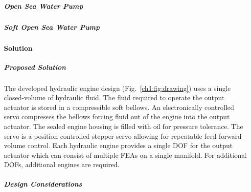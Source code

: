 \hypertarget{ch1:open-sea-water-pump}{%
\subparagraph{Open Sea Water Pump}\label{ch1:open-sea-water-pump}}



\hypertarget{ch1:soft-open-sea-water-pump}{%
\subparagraph{Soft Open Sea Water Pump}\label{ch1:soft-open-sea-water-pump}}

\hypertarget{ch1:solution}{%
\paragraph{Solution}\label{ch1:solution}}

\hypertarget{ch1:proposed-solution}{%
\subparagraph{Proposed Solution}\label{ch1:proposed-solution}}

The developed hydraulic engine design (Fig.~\ref{ch1:fig:drawing}) uses a
single closed-volume of hydraulic fluid. The fluid required to operate the output
actuator is stored in a compressible soft bellows. An electronically
controlled servo compresses the bellows forcing fluid out of the engine
into the output actuator. The sealed engine housing is filled with oil
for pressure tolerance. The servo is a position controlled stepper servo
allowing for repeatable feed-forward volume control. Each hydraulic
engine provides a single \gls{DOF} for the output actuator which can consist
of multiple \glspl{FEA} on a single manifold. For additional \glspl{DOF}, additional
engines are required.


\hypertarget{ch1:design-considerations}{%
\subparagraph{Design Considerations}\label{ch1:design-considerations}}


